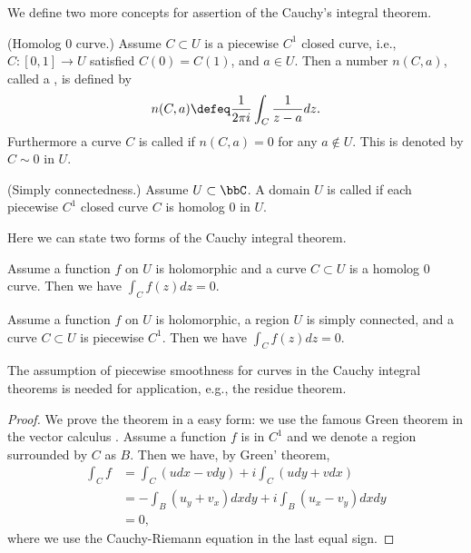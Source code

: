 \documentclass[openany, a4paper, oneside]{jsbook}
\begin{document}
We define two more concepts for assertion of the Cauchy's integral theorem.
\begin{defn}\textup{(Homolog 0 curve.)}
 Assume $C \subset U$ is a piecewise $C^1$ closed curve, i.e., $C \colon [0, 1] \to U$ satisfied $C (0) = C (1)$,
 and $a \in U$.
 Then a number $n (C,a)$, called a , is defined by
\begin{align}
 n (C, a)
 \defeq
 \frac{1}{2 \pi i} \int_{C} \frac{1}{z-a} dz.
\end{align}
Furthermore a curve $C$ is called  if $n (C, a) = 0$ for any $a \notin U$.
This is denoted by $C \sim 0$ in $U$.
\end{defn}
\begin{defn}\textup{(Simply connectedness.)}
 Assume $U \subset \bbC$.
 A domain $U$ is called  if each piecewise $C^1$ closed curve $C$ is homolog 0 in $U$.
\end{defn}
Here we can state two forms of the Cauchy integral theorem.
\begin{thm}
 Assume a function $f$ on $U$ is holomorphic and a curve $C \subset U$ is a homolog 0 curve.
 Then we have $\int_C f (z) dz = 0$.
\end{thm}
\begin{thm}
 Assume a function $f$ on $U$ is holomorphic, a region $U$ is simply connected, and a curve $C \subset U$ is piecewise $C^1$.
 Then we have $\int_C f (z) dz = 0$.
\end{thm}
\begin{rem}
 The assumption of piecewise smoothness for curves in the Cauchy integral theorems is needed for application, e.g., the residue theorem.
\end{rem}
\begin{proof}
We prove the theorem in a easy form: we use the famous Green theorem in the vector calculus \cite{MitsuoSugiura2}.
Assume a function $f$ is in $C^1$ and we denote a region surrounded by $C$ as $B$.
Then we have, by Green' theorem,
\begin{align}
 \int_C f
 &=
 \int_C (u dx - v dy) + i \int_C (u dy + v dx) \\
 &=
 -\int_B (u_y + v_x) dx dy + i \int_B (u_x - v_y) dxdy \\
 &=
 0,
\end{align}
where we use the Cauchy-Riemann equation in the last equal sign.
\end{proof}
\end{document}
